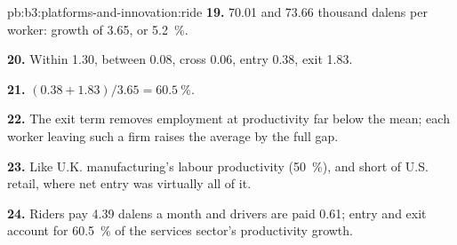 \begin{solution}{pb:b3:platforms-and-innovation:ride}
\textbf{19.} 70.01 and 73.66 thousand dalens per worker: growth of 3.65, or 5.2~\%.

\textbf{20.} Within 1.30, between 0.08, cross 0.06, entry 0.38, exit 1.83.

\textbf{21.} $(0.38 + 1.83)/3.65 = 60.5~\%$.

\textbf{22.} The exit term removes employment at productivity far below the mean; each
worker leaving such a firm raises the average by the full gap.

\textbf{23.} Like U.K. manufacturing's labour productivity (50~\%), and short of U.S. retail, where
net entry was virtually all of it.

\textbf{24.} Riders pay 4.39 dalens a month and drivers are paid 0.61; entry and exit account for
60.5~\% of the services sector's productivity growth.
\end{solution}
